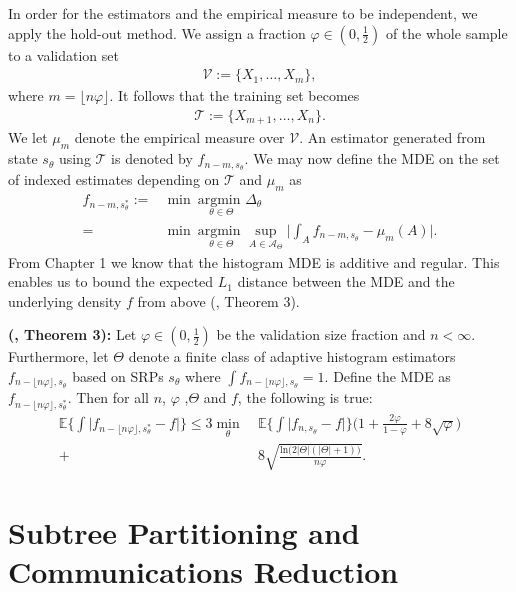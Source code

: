 \documentclass{report}
\begin{document}
In order for the estimators and the empirical measure to be independent, we apply the hold-out method. We assign a fraction $\varphi \in (0, \frac{1}{2})$ of the whole sample to a validation set
\begin{align*}
	\mathcal{V} := \{X_1,\dots,X_{m}\},
\end{align*}
where $m = \lfloor n \varphi \rfloor$. It follows that the training set becomes
\begin{align*}
	\mathcal{T} := \{X_{m + 1},\dots,X_n\}.
\end{align*}
We let $\mu_m$ denote the empirical measure over $\mathcal{V}$. An estimator generated from state $s_\theta$ using $\mathcal{T}$ is denoted by $f_{n-m, s_\theta}$. We may now define the MDE on the set of indexed estimates 
depending on $\mathcal{T}$ and $\mu_m$ as
\begin{align*}
	f_{n-m,s_\theta^*} :=& \min\  \underset{\theta \in \Theta}{\text{argmin }} \Delta_\theta \\
			  =& \min\ \underset{\theta \in \Theta}{\text{argmin }} \sup_{A \in \mathcal{A}_\Theta} \bigg| \int_A f_{n-m,s_\theta} - \mu_m(A) \bigg|.
\end{align*}
From Chapter 1 we know that the histogram MDE is additive and regular. This enables us to bound the expected $L_1$ distance between the MDE and the underlying density $f$ from above (\cite{MDE}, Theorem 3).\newline

\noindent\textbf{(\cite{MDE}, Theorem 3): }Let $\varphi \in (0,\frac{1}{2})$ be the validation size fraction and $n < \infty$. Furthermore, let $\Theta$ denote a finite class of adaptive histogram estimators $f_{n-\lfloor n\varphi \rfloor, s_\theta}$ 
based on SRPs $s_\theta$ where $\int f_{n-\lfloor n\varphi \rfloor, s_\theta} = 1$. Define the MDE as $f_{n-\lfloor n\varphi \rfloor,s_\theta^*}$. Then for all $n$, $\varphi$ ,$\Theta$ and $f$, the following is true:
\begin{align*}
	\mathbb{E}\bigg\{\int \big|f_{n-\lfloor n\varphi \rfloor,s_\theta^*}-f \big| \bigg\} \leq 3 \min_\theta\  &\mathbb{E}\bigg\{\int \big| f_{n,s_\theta}-f \big| \bigg\}\bigg(1 
	+ \frac{2\varphi}{1-\varphi}+8\sqrt{\varphi}\bigg) \\
		+& 8\sqrt{\frac{\text{ln}\big(2|\Theta|(|\Theta| + 1)\big)}{n\varphi}}.
\end{align*}

\chapter{Subtree Partitioning and Communications Reduction}
\end{document}
